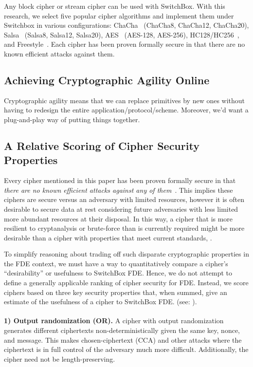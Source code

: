 Any block cipher or stream cipher can be used with SwitchBox. With this
research, we select five popular cipher algorithms and implement them under
Switchbox in various configurations: ChaCha~\cite{ChaCha20} (ChaCha8, ChaCha12,
ChaCha20), Salsa~\cite{SalsaX} (Salsa8, Salsa12, Salsa20), AES~\cite{AES}
(AES-128, AES-256), HC128/HC256~\cite{HCX}, and Freestyle~\cite{Freestyle}. Each
cipher has been proven formally secure in that there are no known efficient
attacks against them.


\subsection{Achieving Cryptographic Agility Online}

Cryptographic agility means that we can replace primitives by new ones without
having to redesign the entire application/protocol/scheme. Moreover, we'd want a
plug-and-play way of putting things together. 

\subsection{A Relative Scoring of Cipher Security Properties}

Every cipher mentioned in this paper has been proven formally secure in that
\emph{there are no known efficient attacks against any of them}~\cite{All,
Ciphers, Again}. This implies these ciphers are secure versus an adversary with
limited resources, however it is often desirable to secure data at rest
considering future adversaries with less limited more abundant resources at
their disposal. In this way, a cipher that is more resilient to cryptanalysis or
brute-force than is currently required might be more desirable than a cipher
with properties that meet current standards, .

To simplify reasoning about trading off such disparate cryptographic properties
in the FDE context, we must have a way to quantitatively compare a cipher's
``desirability'' or usefulness to SwitchBox FDE. Hence, we do not attempt to
define a generally applicable ranking of cipher security for FDE. Instead, we
score ciphers based on three key security properties that, when summed, give an
estimate of the usefulness of a cipher to SwitchBox FDE. (see:
).\\
\\
\textbf{1) Output randomization (OR).} A cipher with output randomization
generates different ciphertexts non-deterministically given the same key, nonce,
and message. This makes chosen-ciphertext (CCA) and other attacks where the
ciphertext is in full control of the adversary much more difficult.
Additionally, the cipher need not be length-preserving.


